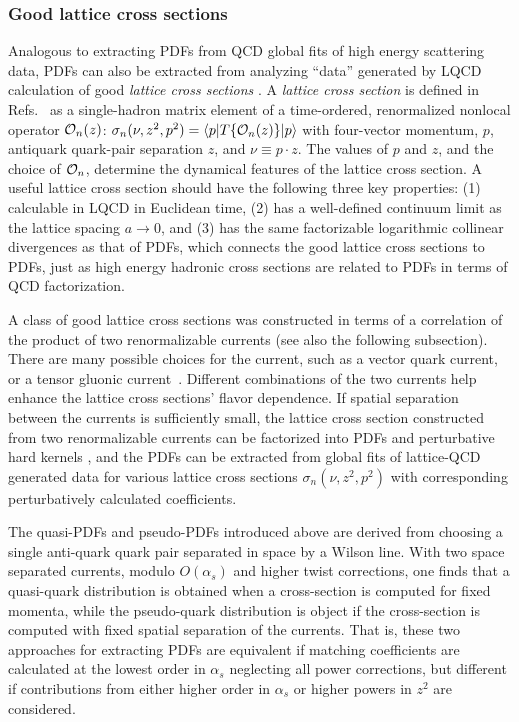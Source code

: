 \subsubsection{Good lattice cross sections}
Analogous to extracting PDFs from QCD global fits of high energy scattering data, PDFs can also be extracted from analyzing ``data'' generated by LQCD calculation of good {\it lattice cross sections} \cite{Ma:2014jla,Ma:2014jga}. A {\it lattice cross section} is defined in Refs.~\cite{ Ma:2014jla,Ma:2014jga} as a single-hadron matrix element of a time-ordered, renormalized nonlocal operator ${\cal O}_n(z)$: ${\sigma}_{n}(\nu,z^2,p^2)=\langle p| {T}\{{\cal O}_n({z})\}|p\rangle$ with four-vector momentum, $p$, antiquark quark-pair separation $z$, and $\nu\equiv p\cdot z$. The values of $p$ and $z$, and the choice of ${\cal O}_n$, determine the dynamical features of the lattice cross section. A useful lattice cross section should have the following three key properties: (1) calculable in LQCD in Euclidean time, (2) has a well-defined continuum limit as the lattice spacing $a\to 0$, and (3) has the same factorizable logarithmic collinear divergences as that of PDFs, which connects the good lattice cross sections to PDFs, just as high energy hadronic cross sections are related to PDFs in terms of QCD factorization.  

A class of { good} lattice cross sections was constructed in terms of a correlation of the product of two {renormalizable} currents (see also the following subsection).  There are many possible choices for the current, such as a vector quark current, or a tensor gluonic current~\cite{Ma:2017pxb}.  Different combinations of the two currents help enhance the lattice cross sections' flavor dependence.  If spatial separation between the currents is sufficiently small, the lattice cross section constructed from two renormalizable currents can be factorized into PDFs and perturbative hard kernels \cite{Ma:2017pxb},
and the PDFs can be extracted from global fits of lattice-QCD generated data for various lattice cross sections $\sigma_{n}(\nu,z^2,p^2)$ with corresponding perturbatively calculated coefficients.

The quasi-PDFs and pseudo-PDFs introduced above are derived from choosing a single anti-quark quark pair separated in space by a Wilson line.
With two space separated currents, modulo $O(\alpha_s)$ and higher twist corrections, one finds that a quasi-quark distribution is obtained when a cross-section is computed for fixed momenta, while the pseudo-quark distribution is object if the cross-section is computed with fixed spatial separation of the currents.  
That is, these two approaches for extracting PDFs are equivalent if matching coefficients are calculated at the lowest order in $\alpha_s$ neglecting all power corrections, but different if contributions from either higher order in $\alpha_s$ or higher powers in $z^2$ are considered.


